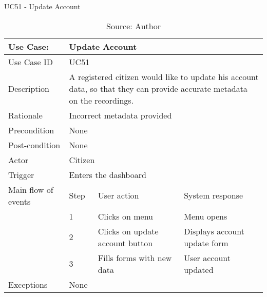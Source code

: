 \begin{table}[ht]
\centering
\caption{UC51 - Update Account}
\label{uc:51}
\begin{tabular}{|p{3cm}|p{1cm}|p{5cm}|p{5cm}|}
\hline
Use Case:       & \multicolumn{3}{p{11cm}|}{Update Account} \\ \hline
Use Case ID     & \multicolumn{3}{p{11cm}|}{UC51} \\ \hline
Description     & \multicolumn{3}{p{11cm}|}{A registered citizen would like to update his account data, so that they can provide accurate metadata on the recordings.} \\ \hline
Rationale       & \multicolumn{3}{p{11cm}|}{Incorrect metadata provided} \\ \hline
Precondition    & \multicolumn{3}{p{11cm}|}{None} \\ \hline
Post-condition  & \multicolumn{3}{p{11cm}|}{None} \\ \hline
Actor           & \multicolumn{3}{p{11cm}|}{Citizen} \\ \hline
Trigger         & \multicolumn{3}{p{11cm}|}{Enters the dashboard} \\ \hline
Main flow of events & Step  & User action & System response \\ \hline
                    & 1     & Clicks on menu & Menu opens \\ \hline
                    & 2     & Clicks on update account button & Displays account update form \\ \hline
                    & 3     & Fills forms with new data & User account updated \\ \hline
Exceptions      & \multicolumn{3}{p{11cm}|}{None} \\ \hline
\end{tabular}
\caption*{Source: Author}
\end{table}

